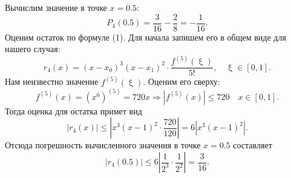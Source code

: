 \documentclass[a4paper, 12pt]{article}
\renewcommand{\leq}{\leqslant}
\renewcommand{\xi}{\upxi}
\begin{document}
	Вычислим значение в точке $x=0.5$:
	$$P_4(0.5) = \dfrac{3}{16} - \dfrac{2}{8} = -\dfrac{1}{16}.$$
	Оценим остаток по формуле (1). Для начала запишем его в общем виде для нашего случая:
	$$r_4(x) = (x-x_0)^3 ( x-x_1)^2\cdot \dfrac{f^{(5)}(\xi)}{5!},\quad \xi \in [0,1].$$
	Нам неизвестно значение $f^{(5)}(\xi)$. Оценим его сверху:
	$$f^{(5)}(x) = (x^6)^{(5)} = 720 x\Rightarrow |f^{(5)}(x)| \leq 720 \quad x\in [0,1].$$
	Тогда оценка для остатка примет вид
	$$|r_4(x)|\leq \left|x^3 ( x-1)^2\cdot \dfrac{720}{120}\right| = 6\left|x^3 ( x-1)^2\right|.$$
	Отсюда погрешность вычисленного значения в точке $x=0.5$ составляет $$|r_4(0.5)|\leq 6\left|\dfrac{1}{2^3} \cdot\dfrac{1}{2^2}\right| = \dfrac{3}{16}.$$
\end{document}
